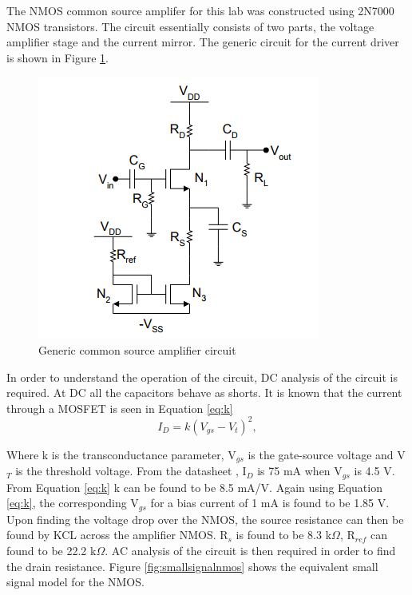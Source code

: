 
	The NMOS common source amplifer for this lab was constructed using 2N7000 NMOS transistors. The circuit essentially consists of two parts, the voltage amplifier stage and the current mirror. The generic circuit for the current driver is shown in Figure \ref{fig:currentgeneric}. 
	
	\begin{figure}[H]
		\centering
		\includegraphics[width=.55\textwidth]{CircuitDevelopment/genericschem.png}
		\caption{Generic common source amplifier circuit \cite{b1}}
		\label{fig:currentgeneric}
	\end{figure}
	
	In order to understand the operation of the circuit, DC analysis of the circuit is required. At DC all the capacitors behave as shorts. It is known that the current through a MOSFET is seen in Equation \ref{eq:k}
	\begin{equation}\label{eq:k}
	I_D = k(V_{gs}-V_t)^2,
	\end{equation}
	
	Where k is the transconductance parameter, V$_{gs}$ is the gate-source voltage and V$_T$ is the threshold voltage. From the datasheet \cite{NMOS},  I$_D$ is 75 mA when V$_{gs}$ is 4.5 V. From Equation \ref{eq:k} k can be found to be 8.5 mA/V. Again using Equation \ref{eq:k}, the corresponding V$_{gs}$ for a bias current of 1 mA is found to be 1.85 V. 
	Upon finding the voltage drop over the NMOS, the source resistance can then be found by KCL across the amplifier NMOS. R$_{s}$ is found to be 8.3 k$\Omega$, R$_{ref}$ can found to be 22.2 k$\Omega$. AC analysis of the circuit is then required in order to find the drain resistance. Figure \ref{fig:smallsignalnmos} shows the equivalent small signal model for the NMOS.
	
